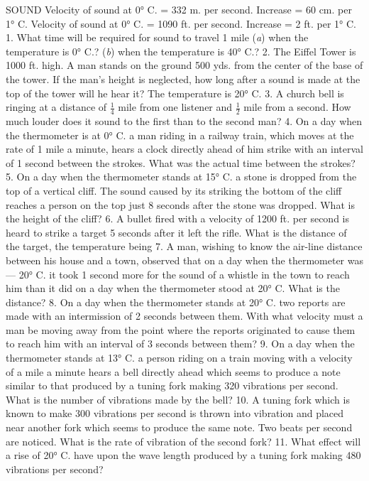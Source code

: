 SOUND
Velocity of sound at 0° C. = 332 m. per second. Increase = 60 cm. per 1° C.
Velocity of sound at 0° C. = 1090 ft. per second. Increase = 2 ft. per 1° C.
1. What time will be required for sound to travel 1 mile (\emph{a}) when the temperature is 0° C.? (\emph{b}) when the temperature is 40° C.?
2. The Eiffel Tower is 1000 ft. high. A man stands on the ground 500 yds. from the center of the base of the tower. If the man's height is neglected, how long after a sound is made at the top of the tower will he hear it? The temperature is 20° C.
3. A church bell is ringing at a distance of $\frac{1}{4}$ mile from one listener and $\frac{1}{2}$ mile from a second. How much louder does it sound to the first than to the second man?
4. On a day when the thermometer is at 0° C. a man riding in a railway train, which moves at the rate of 1 mile a minute, hears a clock directly ahead of him strike with an interval of 1 second between the strokes. What was the actual time between the strokes?
5. On a day when the thermometer stands at 15° C. a stone is dropped from the top of a vertical cliff. The sound caused by its striking the bottom of the cliff reaches a person on the top just 8 seconds after the stone was dropped. What is the height of the cliff?
6. A bullet fired with a velocity of 1200 ft. per second is heard to strike a target 5 seconds after it left the rifle. What is the distance of the target, the temperature being
7. A man, wishing to know the air-line distance between his house and a town, observed that on a day when the thermometer was — 20° C. it took 1 second more for the sound of a whistle in the town to reach him than it did on a day when the thermometer stood at 20° C. What is the distance?
8. On a day when the thermometer stands at 20° C. two reports are made with an intermission of 2 seconds between them. With what velocity must a man be moving away from the point where the reports originated to cause them to reach him with an interval of 3 seconds between them?
9. On a day when the thermometer stands at 13° C. a person riding on a train moving with a velocity of a mile a minute hears a bell directly ahead which seems to produce a note similar to that produced by a tuning fork making 320 vibrations per second. What is the number of vibrations made by the bell?
10. A tuning fork which is known to make 300 vibrations per second is thrown into vibration and placed near another fork which seems to produce the same note. Two beats per second are noticed. What is the rate of vibration of the second fork?
11. What effect will a rise of 20° C. have upon the wave length produced by a tuning fork making 480 vibrations per second?
